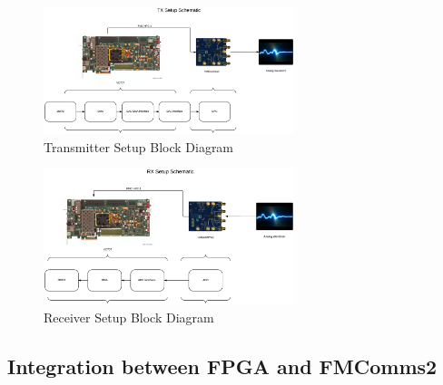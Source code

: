 \begin{figure}[htbp]
    \centering
    \includegraphics[width=0.65\textwidth]{./figures/tx_setup}
    \caption{ Transmitter Setup Block Diagram
    \label{fig:txsetup}}
\end{figure}

\begin{figure}[htbp]
    \centering
    \includegraphics[width=0.65\textwidth]{./figures/rx_setup}
    \caption{ Receiver Setup Block Diagram
    \label{fig:rxsetup}}
\end{figure}



\subsection{Integration between FPGA and FMComms2}



